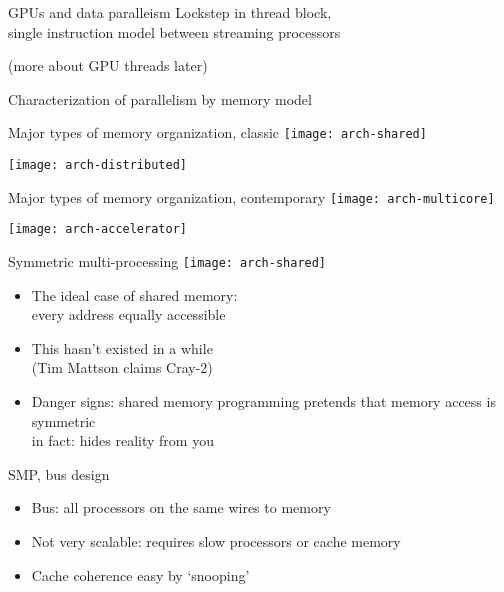\begin{numberedframe}{GPUs and data paralleism}
  Lockstep in thread block, \\
  single instruction model between streaming processors

  (more about GPU threads later)
\end{numberedframe}

 {Characterization of parallelism by memory model}

\begin{numberedframe}{Major types of memory organization, classic}
  \texttt{[image: arch-shared]}

  \texttt{[image: arch-distributed]}
\end{numberedframe}

\begin{numberedframe}{Major types of memory organization, contemporary}
  \texttt{[image: arch-multicore]}

  \texttt{[image: arch-accelerator]}
\end{numberedframe}

\begin{numberedframe}{Symmetric multi-processing}
  \texttt{[image: arch-shared]}
  \begin{itemize}
  \item The ideal case of shared memory:\\
    every address equally accessible
  \item This hasn't existed in a while\\
    (Tim Mattson claims Cray-2)
  \item Danger signs: shared memory programming pretends
    that memory access is symmetric\\
    in fact: hides reality from you
  \end{itemize}
\end{numberedframe}

\begin{numberedframe}{SMP, bus design}
  \begin{itemize}
  \item Bus: all processors on the same wires to memory
  \item Not very scalable: requires slow processors or cache memory
  \item Cache coherence easy by `snooping'
  \end{itemize}
\end{numberedframe}

